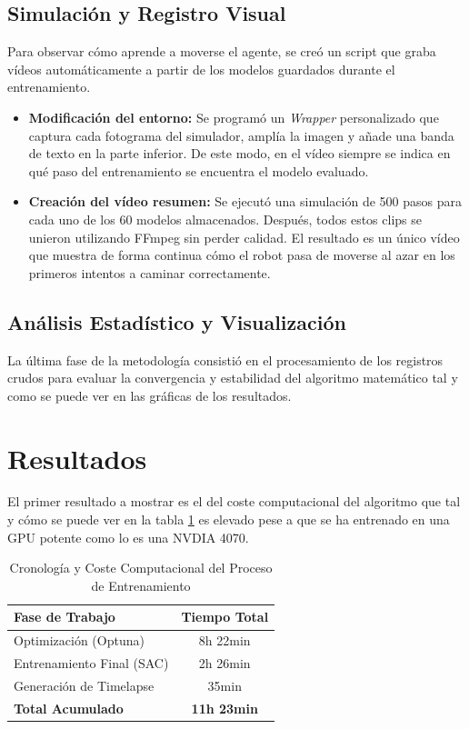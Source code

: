 \documentclass[11pt,a4paper]{article}
\begin{document}
	\subsection{Simulación y Registro Visual}
	Para observar cómo aprende a moverse el agente, se creó un script que graba vídeos automáticamente a partir de los modelos guardados durante el entrenamiento.
	
	\begin{itemize}
		\item \textbf{Modificación del entorno:} Se programó un \textit{Wrapper} personalizado que captura cada fotograma del simulador, amplía la imagen y añade una banda de texto en la parte inferior. De este modo, en el vídeo siempre se indica en qué paso del entrenamiento se encuentra el modelo evaluado.
		\item \textbf{Creación del vídeo resumen:} Se ejecutó una simulación de 500 pasos para cada uno de los 60 modelos almacenados. Después, todos estos clips se unieron utilizando FFmpeg sin perder calidad. El resultado es un único vídeo que muestra de forma continua cómo el robot pasa de moverse al azar en los primeros intentos a caminar correctamente.
	\end{itemize}
	
	\subsection{Análisis Estadístico y Visualización}
	La última fase de la metodología consistió en el procesamiento de los registros crudos para evaluar la convergencia y estabilidad del algoritmo matemático tal y como se puede ver en las gráficas de los resultados.

	\section{Resultados}
	
	El primer resultado a mostrar es el del coste computacional del algoritmo que tal y cómo se puede ver en la tabla \ref{tab:tiempos_metodologia} es elevado pese a que se ha entrenado en una GPU potente como lo es una NVDIA 4070.
	\begin{table}[H]
		\centering
		\begin{tabular}{lc}
			\hline
			\textbf{Fase de Trabajo} &  \textbf{Tiempo Total} \\ \hline
			Optimización (Optuna) & 8h 22min \\
			Entrenamiento Final (SAC) &  2h 26min \\
			Generación de Timelapse & 35min \\ \hline
			\textbf{Total Acumulado} &  \textbf{11h 23min} \\ \hline
		\end{tabular}
		\caption{Cronología y Coste Computacional del Proceso de Entrenamiento}
		\label{tab:tiempos_metodologia}
	\end{table}
	
\end{document}
